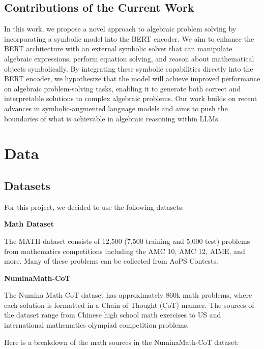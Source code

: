 \documentclass{article}
\begin{document}
\subsection{Contributions of the Current Work}

In this work, we propose a novel approach to algebraic problem solving by incorporating a symbolic model into the BERT encoder. We aim to enhance the BERT architecture with an external symbolic solver that can manipulate algebraic expressions, perform equation solving, and reason about mathematical objects symbolically. By integrating these symbolic capabilities directly into the BERT encoder, we hypothesize that the model will achieve improved performance on algebraic problem-solving tasks, enabling it to generate both correct and interpretable solutions to complex algebraic problems. Our work builds on recent advances in symbolic-augmented language models and aims to push the boundaries of what is achievable in algebraic reasoning within LLMs.


\section{Data}


\subsection{Datasets}

For this project, we decided to use the following datasets:

{\bf Math Dataset}

The MATH dataset \cite{hendrycksmath2021} consists of 12,500 (7,500 training and 5,000 test) problems from mathematics competitions including the AMC 10, AMC 12, AIME, and more. Many of these problems can be collected from AoPS Contests. \cite{aops_contests}

{\bf NuminaMath-CoT}

The Numina Math CoT dataset has approximately 860k math problems, where each solution is formatted in a Chain of Thought (CoT) manner. The sources of the dataset range from Chinese high school math exercises to US and international mathematics olympiad competition problems.
\cite{numina_math_datasets_CoT}

Here is a breakdown of the math sources in the NuminaMath-CoT dataset:
\end{document}
